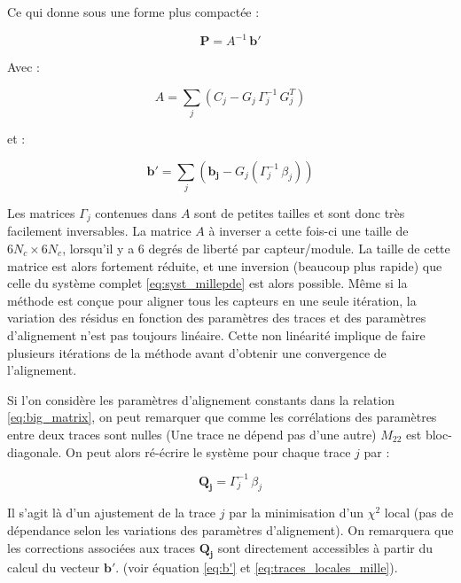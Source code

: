 \begin{appendices}
   Ce qui donne sous une forme plus compact\'ee :
   
   \begin{equation}
    \mathbf{P} = A^{-1} \, \mathbf{b'}
   \end{equation}

   Avec : 
   
   \begin{equation}
    A = \sum_j \left( C_j- G_j \, \Gamma_j^{-1} \, G_j^T \right)
   \end{equation}
   
   et :
   
   \begin{equation}
    \mathbf{b'} = \sum_j \left( \mathbf{b_j} - G_j(\Gamma_j^{-1} \, \beta_j) \right) 
    \label{eq:b'}
   \end{equation}

   Les matrices $\Gamma_j$ contenues dans $A$ sont de petites tailles et sont donc tr\`es facilement inversables. La matrice $A$ \`a inverser a cette fois-ci une taille de $6N_c \times 6N_c$, lorsqu'il y a 6 degr\'es de libert\'e par capteur/module. La taille de cette matrice est alors fortement r\'eduite, et une inversion (beaucoup plus rapide) que celle du syst\`eme complet \ref{eq:syst_millepde} est alors possible. M\^eme si la m\'ethode est conçue pour aligner tous les capteurs en une seule it\'eration, la variation des r\'esidus en fonction des param\`etres des traces et des param\`etres d'alignement n'est pas toujours lin\'eaire. Cette non lin\'earit\'e implique de faire plusieurs it\'erations de la m\'ethode avant d'obtenir une convergence de l'alignement.
   
   \medskip
   
   Si l'on consid\`ere les param\`etres d'alignement constants dans la relation \ref{eq:big_matrix}, on peut remarquer que comme les corr\'elations des param\`etres entre deux traces sont nulles (Une trace ne d\'epend pas d'une autre) $M_{22}$ est bloc-diagonale. On peut alors r\'e-\'ecrire le syst\`eme pour chaque trace $j$ par :
   
   \begin{equation}
    \mathbf{Q_j} = \Gamma_j^{-1} \, \beta_j
    \label{eq:traces_locales_mille}
   \end{equation}

   Il s'agit l\`a d'un ajustement de la trace $j$ par la minimisation d'un $\chi^2$ local (pas de d\'ependance selon les variations des param\`etres d'alignement). On remarquera que les corrections associ\'ees aux traces $\mathbf{Q_j}$ sont directement accessibles \`a partir du calcul du vecteur $\mathbf{b'}$. (voir \'equation \ref{eq:b'} et \ref{eq:traces_locales_mille}).


\end{appendices}

